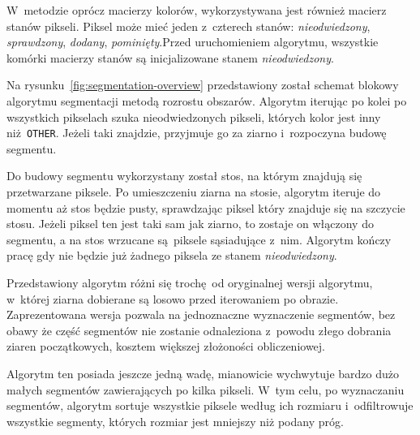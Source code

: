 W~metodzie oprócz macierzy kolorów, wykorzystywana jest również macierz stanów pikseli. Piksel może mieć jeden z~czterech stanów: \emph{nieodwiedzony}, \emph{sprawdzony}, \emph{dodany}, \emph{pominięty}.Przed uruchomieniem algorytmu, wszystkie komórki macierzy stanów są inicjalizowane stanem \emph{nieodwiedzony}.


Na rysunku~\ref{fig:segmentation-overview} przedstawiony został schemat blokowy algorytmu segmentacji metodą rozrostu obszarów. Algorytm iterując po kolei po wszystkich pikselach szuka nieodwiedzonych pikseli, których kolor jest inny niż \texttt{OTHER}. Jeżeli taki znajdzie, przyjmuje go za ziarno i~rozpoczyna budowę segmentu.

Do budowy segmentu wykorzystany został stos, na którym znajdują się przetwarzane piksele. Po umieszczeniu ziarna na stosie, algorytm iteruje do momentu aż stos będzie pusty, sprawdzając piksel który znajduje się na szczycie stosu. Jeżeli piksel ten jest taki sam jak ziarno, to zostaje on włączony do segmentu, a na stos wrzucane są piksele sąsiadujące z~nim. Algorytm kończy pracę gdy nie będzie już żadnego piksela ze stanem \emph{nieodwiedzony}.

Przedstawiony algorytm różni się trochę od oryginalnej wersji algorytmu, w~której ziarna dobierane są losowo przed iterowaniem po obrazie. Zaprezentowana wersja pozwala na jednoznaczne wyznaczenie segmentów, bez obawy że część segmentów nie zostanie odnaleziona z~powodu złego dobrania ziaren początkowych, kosztem większej złożoności obliczeniowej.

Algorytm ten posiada jeszcze jedną wadę, mianowicie wychwytuje bardzo dużo małych segmentów zawierających po kilka pikseli. W~tym celu, po wyznaczaniu segmentów, algorytm sortuje wszystkie piksele według ich rozmiaru i~odfiltrowuje wszystkie segmenty, których rozmiar jest mniejszy niż podany próg.
